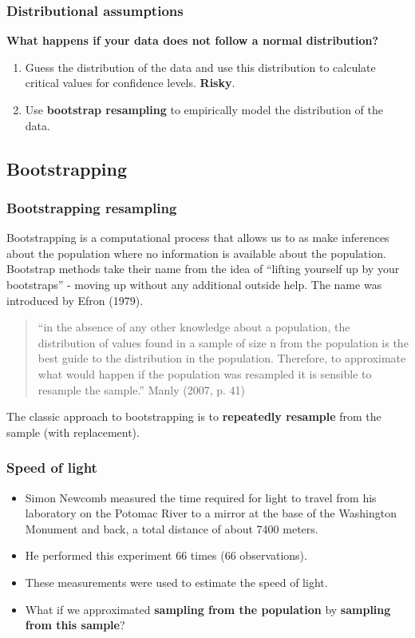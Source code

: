 \documentclass[a4paper]{article}\usepackage[]{graphicx}\usepackage[]{xcolor}
\begin{document}
\subsubsection{Distributional assumptions}
\begin{greenbox}
	\textbf{What happens if your data does not follow a normal distribution?}
\end{greenbox}
\begin{enumerate}
	\item Guess the distribution of the data and use this distribution to calculate critical values for confidence levels. \textcolor{myred}{\textbf{Risky}}.
	\item Use \textcolor{mygreen}{\textbf{bootstrap resampling}} to empirically model the distribution of the data.
\end{enumerate}
\subsection{Bootstrapping}
\subsubsection{Bootstrapping resampling}
Bootstrapping is a computational process that allows us to as make inferences about the population where no information is available about the population.
Bootstrap methods take their name from the idea of ``lifting yourself up by your bootstraps'' - moving up without any additional outside help. The name was introduced by Efron (1979).
\begin{quote}
	``in the absence of any other knowledge about a population, the distribution of values found in a sample of size n from the population is the best guide to the distribution in the population. Therefore, to approximate what would happen if the population was resampled it is sensible to resample the sample.'' Manly (2007, p. 41)
\end{quote}
The classic approach to bootstrapping is to \textcolor{mygreen}{\textbf{repeatedly resample}} from the sample (with replacement).
\subsubsection{Speed of light}
\begin{itemize}
	\item Simon Newcomb measured the time required for light to travel from his laboratory on the Potomac River to a mirror at the base of the Washington Monument and back, a total distance of about 7400 meters.
	\item He performed this experiment 66 times (66 observations).
	\item These measurements were used to estimate the speed of light.
	\item What if we approximated \textbf{sampling from the population} by \textbf{sampling from this sample\textbf{}}?
\end{itemize}
\end{document}

